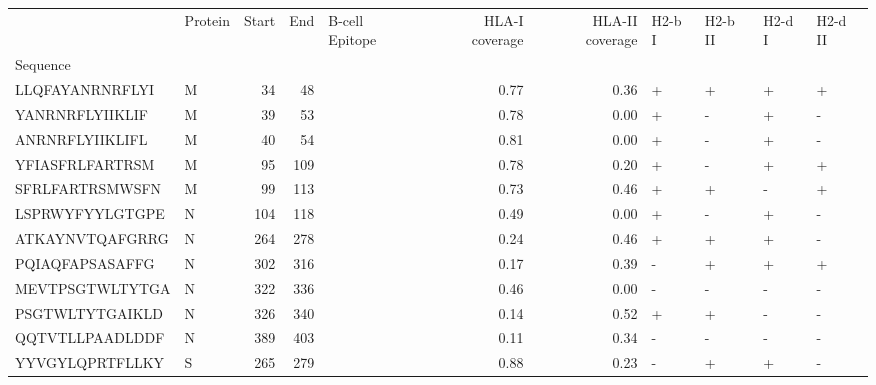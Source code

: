 \begin{tabular}{llrrlrrllll}
\toprule
{} & Protein &  Start &   End &      B-cell Epitope &  HLA-I coverage &  HLA-II coverage & H2-b I & H2-b II & H2-d I & H2-d II \\
Sequence        &         &        &       &                     &                 &                  &        &         &        &         \\
\midrule
LLQFAYANRNRFLYI &       M &     34 &    48 &                     &            0.77 &             0.36 &      + &       + &      + &       + \\
YANRNRFLYIIKLIF &       M &     39 &    53 &                     &            0.78 &             0.00 &      + &       - &      + &       - \\
ANRNRFLYIIKLIFL &       M &     40 &    54 &                     &            0.81 &             0.00 &      + &       - &      + &       - \\
YFIASFRLFARTRSM &       M &     95 &   109 &                     &            0.78 &             0.20 &      + &       - &      + &       + \\
SFRLFARTRSMWSFN &       M &     99 &   113 &                     &            0.73 &             0.46 &      + &       + &      - &       + \\
LSPRWYFYYLGTGPE &       N &    104 &   118 &                     &            0.49 &             0.00 &      + &       - &      + &       - \\
ATKAYNVTQAFGRRG &       N &    264 &   278 &                     &            0.24 &             0.46 &      + &       + &      + &       - \\
PQIAQFAPSASAFFG &       N &    302 &   316 &                     &            0.17 &             0.39 &      - &       + &      + &       + \\
MEVTPSGTWLTYTGA &       N &    322 &   336 &                     &            0.46 &             0.00 &      - &       - &      - &       - \\
PSGTWLTYTGAIKLD &       N &    326 &   340 &                     &            0.14 &             0.52 &      + &       + &      - &       - \\
QQTVTLLPAADLDDF &       N &    389 &   403 &                     &            0.11 &             0.34 &      - &       - &      - &       - \\
YYVGYLQPRTFLLKY &       S &    265 &   279 &                     &            0.88 &             0.23 &      - &       + &      + &       - \\

\end{tabular}

